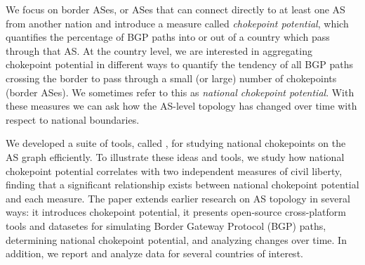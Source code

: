 We focus on border ASes, or ASes that can connect directly to at least
one AS from another nation and introduce a measure called \emph{chokepoint potential}, which quantifies the percentage of BGP paths into or out of a country which pass through that AS.  At the country level, we are interested in aggregating chokepoint potential in different ways to quantify the tendency of all BGP paths crossing the border to pass through a small (or large) number of chokepoints (border ASes). We sometimes refer to this as \emph{national chokepoint potential}.
With these measures 
we can ask how the AS-level topology has changed over time with respect
to national boundaries. 

We developed a
suite of tools, called \toolname{}, for studying national chokepoints on
the AS graph efficiently. To illustrate these ideas and tools, we
study how national chokepoint potential correlates with two independent
measures of civil liberty, finding that a significant relationship exists between national chokepoint potential and each measure.
The paper extends earlier research on AS topology in several ways: it introduces chokepoint potential, it presents open-source cross-platform tools and datasetes for simulating Border Gateway Protocol (BGP) paths,
determining national chokepoint potential, and analyzing changes over time.  In addition, we report and analyze data for several countries of interest.


